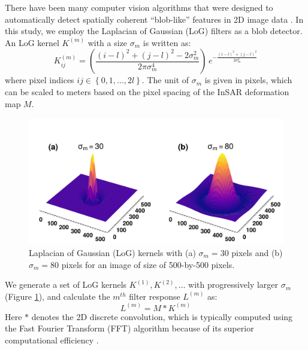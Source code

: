 There have been many computer vision algorithms that were designed to automatically detect spatially coherent ``blob-like'' features in 2D image data \citep{Lindeberg1993DetectingSalientBlob, Lindeberg1998FeatureDetectionAutomatic, Lowe2004DistinctiveImageFeatures}. In this study, we employ the Laplacian of Gaussian (LoG) filters as a blob detector. An LoG kernel $K^{(m)}$ with a size $\sigma_m$ is written as:
\begin{equation}
	K^{(m)}_{ij} = \left(\frac{(i - l)^2 + (j - l)^2 - 2\sigma_m^2}{2 \pi \sigma_m^4}\right) \, e^{-\frac{ (i - l)^2 + (j - l)^2}{2 \sigma_m^2}} \label{eq:log-kernel}
\end{equation}
where pixel indices $ij  \in \left\lbrace 0, 1, \ldots, 2l \right\rbrace$. The unit of $\sigma_m$ is given in pixels, which can be scaled to meters based on the pixel spacing of the InSAR deformation map $M$.



\begin{figure}
	\centering
	\includegraphics[width=0.95\linewidth]{figures/chapter6-blobs/figure1_log_examples.pdf}
	\caption[LoG kernel examples]{
		Laplacian of Gaussian (LoG) kernels with (a) $\sigma_m=30$ pixels and (b) $\sigma_m=80$ pixels for an image of size of 500-by-500 pixels.
	}
	\label{fig:log-kernel}
\end{figure}



We generate a set of LoG kernels $K^{(1)}, K^{(2)}, \ldots$ with progressively larger $\sigma_m$ (Figure \ref{fig:log-kernel}), and calculate the $m^{th}$ filter response $ L^{(m)} $ as:
\begin{equation}
	L^{(m)} = M \ast K^{(m)}  \label{eq:log-layer-conv}
\end{equation}
Here $*$ denotes the 2D discrete convolution, which is typically computed using the Fast Fourier Transform (FFT) algorithm because of its superior computational efficiency \citep{Szeliski2022ComputerVision}.



